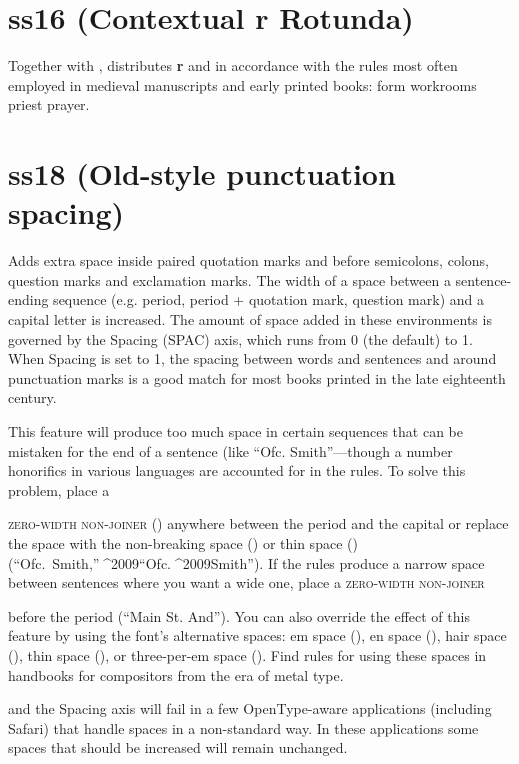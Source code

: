 \documentclass[12pt,letterpaper,openany]{book}
\begin{document}
\section{ss16 (Contextual r Rotunda)}
Together with , distributes \textbf{r} and
\textbf{} in accordance with the rules most often employed in medieval manuscripts and early printed books: { form workrooms priest prayer}.

\section{ss18 (Old-style punctuation spacing)}
{\spaced{} Adds extra space inside paired quotation marks and before semicolons, colons, question
marks and exclamation marks. The width of a space between a sentence-ending sequence
(e.g. period, period + quotation mark, question mark) and a capital letter is increased.
The amount of space added in these environments is governed by the Spacing (SPAC) axis,
which runs from 0 (the default) to 1. When Spacing is set to 1, the spacing between
words and sentences and around punctuation marks is a good match for most books
printed in the late eighteenth century.

This feature will produce too much space in certain sequences that can be mistaken
for the end of a sentence (like “Ofc. Smith”—though a number
honorifics in various languages are accounted for in the rules. To solve this problem, place a}
\textsc{zero-width non-joiner }{\spaced{}() anywhere between the period and the capital
or replace the space with the non-breaking space () or thin space () (“Ofc.^^a0Smith,”^^^^2009“Ofc.^^^^2009Smith”). If
the rules produce a narrow space between sentences where you want a wide one,
place a }\textsc{zero-width non-joiner} {\spaced{}before the period (“Main St\/. And”).
You can also override the effect of this feature by using the font’s alternative
spaces: em space (), en space (), hair space (), thin space (),
or three-per-em space (). Find rules for using these spaces in
handbooks for compositors from the era of metal type.

 and the Spacing axis will fail in a few OpenType-aware applications (including Safari) that
handle spaces in a non-standard way. In these applications some spaces that should be increased
will remain unchanged.}
\end{document}
